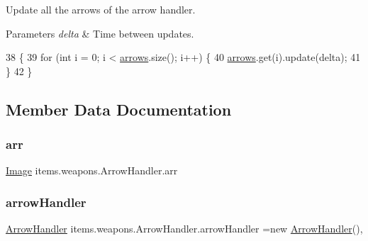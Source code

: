 Update all the arrows of the arrow handler.


\begin{DoxyParams}{Parameters}
{\em delta} & Time between updates. \\
\hline
\end{DoxyParams}

\begin{DoxyCode}
38                                   \{
39         \textcolor{keywordflow}{for} (\textcolor{keywordtype}{int} i = 0; i < \mbox{\hyperlink{classitems_1_1weapons_1_1_arrow_handler_a7038dd7e7fa3db85bcddf0d8601d4271}{arrows}}.size(); i++) \{
40             \mbox{\hyperlink{classitems_1_1weapons_1_1_arrow_handler_a7038dd7e7fa3db85bcddf0d8601d4271}{arrows}}.get(i).update(delta);
41         \}
42     \}
\end{DoxyCode}


\subsection{Member Data Documentation}
\mbox{\label{classitems_1_1weapons_1_1_arrow_handler_a5d5966436e98e6c2792992e1643fffd5}} 
\subsubsection{\texorpdfstring{arr}{arr}}
{\footnotesize\ttfamily \mbox{\hyperlink{classorg_1_1newdawn_1_1slick_1_1_image}{Image}} items.\+weapons.\+Arrow\+Handler.\+arr\hspace{0.3cm}{\ttfamily [private]}}

\mbox{\label{classitems_1_1weapons_1_1_arrow_handler_a1d4f905a340ec4bdccbefeb1a8cac834}} 
\subsubsection{\texorpdfstring{arrow\+Handler}{arrowHandler}}
{\footnotesize\ttfamily \mbox{\hyperlink{classitems_1_1weapons_1_1_arrow_handler}{Arrow\+Handler}} items.\+weapons.\+Arrow\+Handler.\+arrow\+Handler =new \mbox{\hyperlink{classitems_1_1weapons_1_1_arrow_handler}{Arrow\+Handler}}()\hspace{0.3cm}{\ttfamily [static]}, {\ttfamily [private]}}

